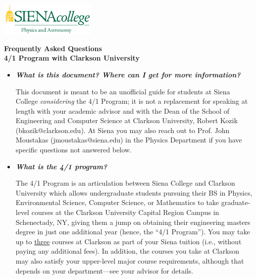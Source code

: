 \documentclass[12pt]{article}
\begin{document}
\hfill \includegraphics[width=0.35\textwidth]{siena_phys_astro_print_crop.jpg}

\vspace{0.2cm}
\begin{center}
{\LARGE {\bf Frequently Asked Questions}} \\
\medskip
{\Large {\bf 4/1 Program with Clarkson University}} 
\end{center}
\vspace{0.3cm}


\begin{itemize}
\item{{\bf {\em What is this document? Where can I get for more information?}} 

This document is meant to be an unofficial guide for students at Siena College
\emph{considering} the 4/1 Program; it is not a replacement for speaking at
length with your academic advisor and with the Dean of the School of Engineering
and Computer Science at Clarkson University, Robert Kozik (bkozik@clarkson.edu).
At Siena you may also reach out to Prof. John Moustakas (jmoustakas@siena.edu)
in the Physics Department if you have specific questions not answered below.}

\item{{\bf {\em What is the 4/1 program?}}

The 4/1 Program is an articulation between Siena College and Clarkson University
which allows undergraduate students pursuing their BS in Physics, Environmental
Science, Computer Science, or Mathematics to take graduate-level courses at the
Clarkson University Capital Region Campus in Schenectady, NY, giving them a jump
on obtaining their engineering masters degree in just one additional year
(hence, the ``4/1 Program'').  You may take up to \underline{three} courses at
Clarkson as part of your Siena tuition (i.e., without paying any additional
fees).  In addition, the courses you take at Clarkson may also satisfy your
upper-level major course requirements, although that depends on your
department---see your advisor for details.}



\end{itemize}
\end{document}
